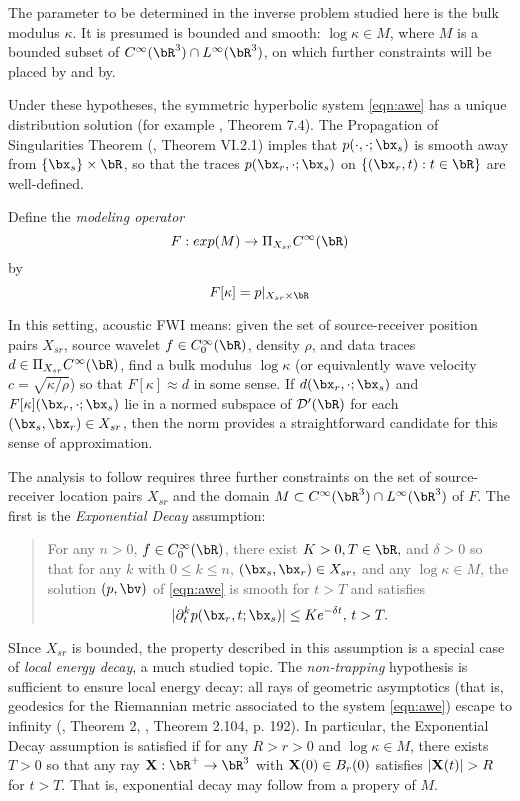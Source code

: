 The parameter to be determined in the inverse problem studied here is
the bulk modulus $\kappa$. It is presumed is bounded and smooth: $\log
\kappa \in M$, where $M$ is a bounded subset of $C^{\infty}(\bR^3) \cap
L^{\infty}(\bR^3)$, on which further constraints will be placed by and
by. 

Under these hypotheses, the symmetric hyperbolic system \ref{eqn:awe}
has a unique distribution solution (for example \cite{Lax:PDENotes},
Theorem 7.4). The Propagation of
Singularities Theorem (\cite{Tay:81}, Theorem VI.2.1) %
imples that $p(\cdot,\cdot;\bx_s)$ is smooth away from $\{\bx_s\}
\times \bR$, so that the traces $p(\bx_r, \cdot;\bx_s)$ on
$\{(\bx_r,t): t \in \bR\}$ are well-defined.

Define the {\em modeling operator}
\begin{equation}
  \label{eqn:modop}
  F: exp(M)  \rightarrow \Pi_{X_{sr}} C^{\infty}(\bR)
\end{equation}
by
\begin{equation}
  \label{eqn:modopdef}
  F[\kappa]= p|_{X_{sr} \times \bR}
\end{equation}

In this setting, acoustic FWI means: given the set of
source-receiver position pairs $X_{sr}$, source wavelet
$f \in C_0^{\infty}(\bR)$,  density $\rho$, and data traces
$d \in \Pi_{X_{sr}} C^{\infty}(\bR)$, find a bulk modulus $\log
\kappa$
(or equivalently wave velocity $c=\sqrt{\kappa/\rho}$)
so that $F[\kappa] \approx d$ in some sense. If
$d(\bx_r,\cdot;\bx_s)$ and $F[\kappa](\bx_r,\cdot;\bx_s)$ lie in a normed subspace of ${\cal D}'(\bR)$ for each
$(\bx_s,\bx_r) \in X_{sr}$, then the
norm provides a straightforward candidate for this sense of
approximation.

The analysis to follow requires three further constraints on the set
of source-receiver location pairs $X_{sr}$ and the domain
$M \subset C^{\infty}(\bR^3) \cap L^{\infty}(\bR^3)$ of $F$. The first is
the {\em Exponential Decay} assumption:
\begin{quote}
  For any $n > 0$, $f \in C_0^{\infty}(\bR)$,
  there exist $K >
  0, T \in \bR,$ and $\delta>0$ so
  that for any $k$ with $0 \le k \le n$, $(\bx_s,\bx_r) \in
 X_{sr},$ and any $\log \kappa \in M$, the solution $(p,\bv)$ of \ref{eqn:awe} is smooth
  for $t>T$ and satisfies
  \[
    |\partial_t^k p(\bx_r,t;\bx_s)| \le K e^{-\delta t}, \, t > T.
  \]
\end{quote}
SInce $X_{sr}$ is bounded, the property described in this assumption
is a special case of {\em local energy decay}, a much studied topic. The {\em
  non-trapping} hypothesis is sufficient to ensure local energy decay:
all rays of geometric asymptotics (that is, geodesics for the Riemannian metric associated
to the system \ref{eqn:awe}) escape to infinity (\cite{Hristova:09},
Theorem 2, \cite{EgorovShubin}, Theorem 2.104, p. 192). In particular,
the Exponential Decay assumption is satisfied if for any $R > r>0$ and $\log
\kappa \in M$, there exists $T>0$ so that any ray ${\bf X}:\bR^+\rightarrow \bR^3$
  with ${\bf X}(0) \in B_r(0)$ satisfies $|{\bf X}(t)|>R$ for $t > T$. That is,
exponential decay may follow from a propery of $M$.

